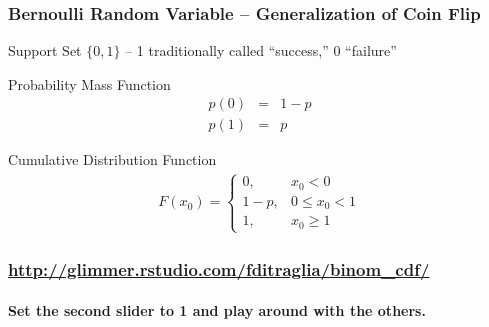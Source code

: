 \documentclass[handout]{beamer}
\begin{document}
\begin{frame}
\frametitle{Bernoulli Random Variable -- Generalization of Coin Flip}
\small
\begin{block}{Support Set}
$\{0,1\}$ -- 1 traditionally called ``success,'' 0 ``failure''
\end{block}

\begin{block}{Probability Mass Function}
	\begin{eqnarray*}
		p(0) &=& 1-p\\
		p(1) &=& p
	\end{eqnarray*}

	\begin{block}{Cumulative Distribution Function}
\begin{eqnarray*}
	F(x_0) = \left\{\begin{array}{ll} 0,& x_0 < 0\\ 1-p, &0\leq x_0 < 1\\ 1,& x_0 \geq 1\end{array}\right.
\end{eqnarray*}
\end{block}
\end{block}

\end{frame}
\begin{frame}
	\frametitle{\href{http://glimmer.rstudio.com/fditraglia/binom_cdf/}{http://glimmer.rstudio.com/fditraglia/binom\_cdf/}}
\framesubtitle{Set the second slider to 1 and play around with the others.}

\begin{figure}
\end{figure}

\end{frame}
\end{document}
